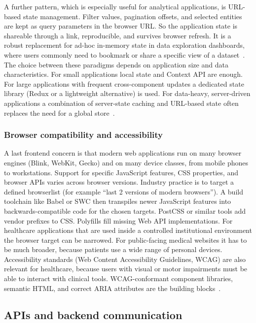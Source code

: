 A further pattern, which is especially useful for analytical applications, is URL-based state management. Filter values, pagination offsets, and selected entities are kept as query parameters in the browser URL. So the application state is shareable through a link, reproducible, and survives browser refresh. It is a robust replacement for ad-hoc in-memory state in data exploration dashboards, where users commonly need to bookmark or share a specific view of a dataset~\cite{putra2025api_react_laravel}. The choice between these paradigms depends on application size and data characteristics. For small applications local state and Context API are enough. For large applications with frequent cross-component updates a dedicated state library (Redux or a lightweight alternative) is used. For data-heavy, server-driven applications a combination of server-state caching and URL-based state often replaces the need for a global store~\cite{geeksforgeeks_state_mgmt_2025}.

\subsubsection{Browser compatibility and accessibility}
\label{subsec:compatibility}

A last frontend concern is that modern web applications run on many browser engines (Blink, WebKit, Gecko) and on many device classes, from mobile phones to workstations. Support for specific JavaScript features, CSS properties, and browser APIs varies across browser versions. Industry practice is to target a defined browserlist (for example ``last 2 versions of modern browsers''). A build toolchain like Babel or SWC then transpiles newer JavaScript features into backwards-compatible code for the chosen targets. PostCSS or similar tools add vendor prefixes to CSS. Polyfills fill missing Web API implementations. For healthcare applications that are used inside a controlled institutional environment the browser target can be narrowed. For public-facing medical websites it has to be much broader, because patients use a wide range of personal devices. Accessibility standards (Web Content Accessibility Guidelines, WCAG) are also relevant for healthcare, because users with visual or motor impairments must be able to interact with clinical tools. WCAG-conformant component libraries, semantic HTML, and correct ARIA attributes are the building blocks~\cite{yuan2024designrepair}.

\subsection{APIs and backend communication}
\label{sec:apis-backend}

